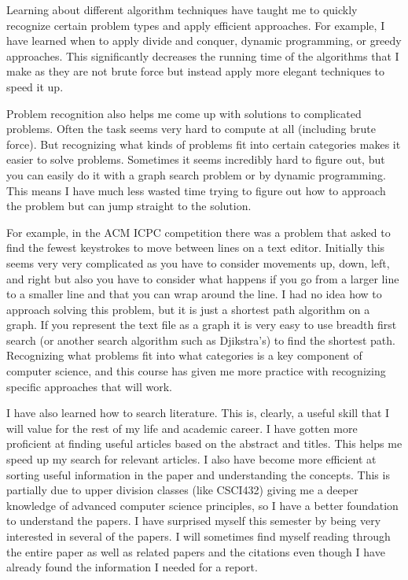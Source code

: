 \documentclass{article}
\begin{document}
Learning about different algorithm techniques have taught me to quickly recognize certain problem types and apply efficient approaches.
For example, I have learned when to apply divide and conquer, dynamic programming,
or greedy approaches. This significantly decreases the running time of the algorithms that I make as they are not brute force but instead apply more elegant techniques to speed it up.

Problem recognition also helps me come up with solutions to complicated problems.
Often the task seems very hard to compute at all (including brute force). But recognizing what kinds of problems fit into certain categories makes it easier to solve problems.
Sometimes it seems incredibly hard to figure out, but you can easily do it with a graph search problem or by dynamic programming.
This means I have much less wasted time trying to figure out how to approach the problem but can jump straight to the solution.

For example, in the ACM ICPC competition there was a problem that asked to find the fewest keystrokes to move between lines on a text editor.
Initially this seems very very complicated as you have to consider movements up,
down, left, and right but also you have to consider what happens if you go from a larger line to a smaller line and that you can wrap around the line.
I had no idea how to approach solving this problem, but it is just a shortest path algorithm on a graph.
If you represent the text file as a graph it is very easy to use breadth first search (or another search algorithm such as Djikstra's) to find the shortest path.
Recognizing what problems fit into what categories is a key component of computer science,
and this course has given me more practice with recognizing specific approaches that will work.

I have also learned how to search literature. This is, clearly, a useful skill that I will value for the rest of my life and academic career. 
I have gotten more proficient at finding useful articles based on the abstract and titles. This helps me speed up my search for relevant articles. 
I also have become more efficient at sorting useful information in the paper and understanding the concepts. This is partially due to upper division classes (like CSCI432) giving me a deeper knowledge of advanced computer science principles, so I have a better foundation to understand the papers. 
I have surprised myself this semester by being very interested in several of the papers. I will sometimes find myself reading through the entire paper as well as related papers and the citations even though I have already found the information I needed for a report.
\end{document}
